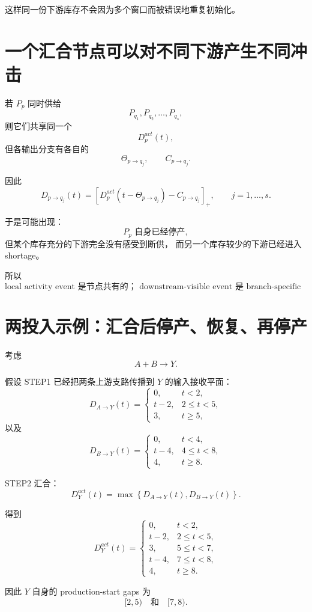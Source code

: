 \documentclass[UTF8,11pt]{ctexart}
\begin{document}
这样同一份下游库存不会因为多个窗口而被错误地重复初始化。

\section{一个汇合节点可以对不同下游产生不同冲击}

若 \(P_p\) 同时供给
\[
P_{q_1},P_{q_2},\ldots,P_{q_s},
\]
则它们共享同一个
\[
D_p^{act}(t),
\]
但各输出分支有各自的
\[
\Theta_{p\to q_j},
\qquad
C_{p\to q_j}.
\]

因此
\[
\boxed{
D_{p\to q_j}(t)
=
\left[
D_p^{act}(t-\Theta_{p\to q_j})
-
C_{p\to q_j}
\right]_+,
\qquad
j=1,\ldots,s.
}
\tag{24}
\]

于是可能出现：
\[
P_p\text{ 自身已经停产},
\]
但某个库存充分的下游完全没有感受到断供，
而另一个库存较少的下游已经进入 shortage。

所以
\[
\boxed{
\text{local activity event 是节点共有的；
downstream-visible event 是 branch-specific 的。}
}
\tag{25}
\]

\section{两投入示例：汇合后停产、恢复、再停产}

考虑
\[
A+B\longrightarrow Y.
\]

假设 STEP1 已经把两条上游支路传播到 \(Y\) 的输入接收平面：
\[
D_{A\to Y}(t)
=
\begin{cases}
0, & t<2,\\
t-2, & 2\le t<5,\\
3, & t\ge5,
\end{cases}
\]
以及
\[
D_{B\to Y}(t)
=
\begin{cases}
0, & t<4,\\
t-4, & 4\le t<8,\\
4, & t\ge8.
\end{cases}
\]

STEP2 汇合：
\[
\boxed{
D_Y^{act}(t)
=
\max\left\{
D_{A\to Y}(t),
D_{B\to Y}(t)
\right\}.
}
\]

得到
\[
D_Y^{act}(t)
=
\begin{cases}
0, & t<2,\\
t-2, & 2\le t<5,\\
3, & 5\le t<7,\\
t-4, & 7\le t<8,\\
4, & t\ge8.
\end{cases}
\]

因此 \(Y\) 自身的 production-start gaps 为
\[
\boxed{
[2,5)
\quad\text{和}\quad
[7,8).
}
\]
\end{document}
